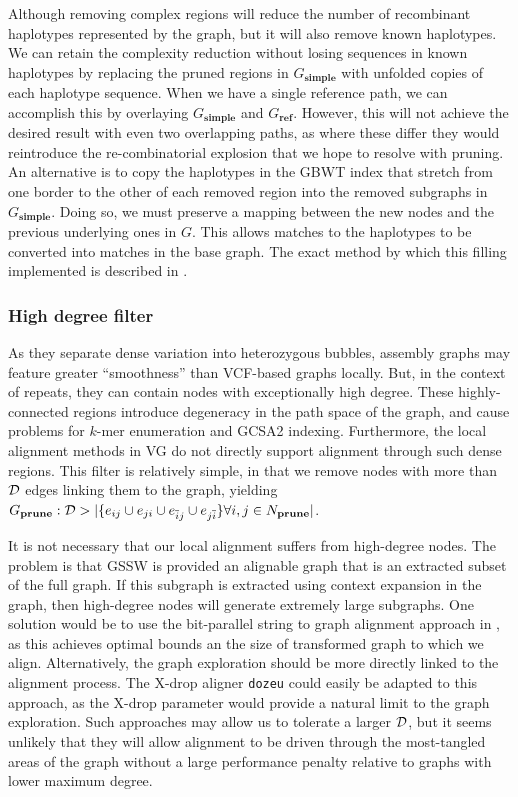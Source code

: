 Although removing complex regions will reduce the number of recombinant haplotypes represented by the graph, but it will also remove known haplotypes.
We can retain the complexity reduction without losing sequences in known haplotypes by replacing the pruned regions in $G_\textbf{simple}$ with unfolded copies of each haplotype sequence.
When we have a single reference path, we can accomplish this by overlaying $G_\textbf{simple}$ and $G_\textbf{ref}$.
However, this will not achieve the desired result with even two overlapping paths, as where these differ they would reintroduce the re-combinatorial explosion that we hope to resolve with pruning.
An alternative is to copy the haplotypes in the GBWT index that stretch from one border to the other of each removed region into the removed subgraphs in $G_\textbf{simple}$.
Doing so, we must preserve a mapping between the new nodes and the previous underlying ones in $G$.
This allows matches to the haplotypes to be converted into matches in the base graph.
The exact method by which this filling implemented is described in \cite{siren2018haplotype}.

\subsubsection{High degree filter}

As they separate dense variation into heterozygous bubbles, assembly graphs may feature greater ``smoothness'' than VCF-based graphs locally.
But, in the context of repeats, they can contain nodes with exceptionally high degree.
These highly-connected regions introduce degeneracy in the path space of the graph, and cause problems for $k$-mer enumeration and GCSA2 indexing.
Furthermore, the local alignment methods in VG do not directly support alignment through such dense regions.
This filter is relatively simple, in that we remove nodes with more than ${\cal D}$ edges linking them to the graph, yielding $G_\textbf{prune} : {\cal D} > |\{ e_{ij} \cup e_{ji} \cup e_{\overline{i}j} \cup e_{j\overline{i}} \} \forall i,j \in N_\textbf{prune}|$.

It is not necessary that our local alignment suffers from high-degree nodes.
The problem is that GSSW is provided an alignable graph that is an extracted subset of the full graph.
If this subgraph is extracted using context expansion in the graph, then high-degree nodes will generate extremely large subgraphs.
One solution would be to use the bit-parallel string to graph alignment approach in \cite{rautiainen2018bit}, as this achieves optimal bounds an the size of transformed graph to which we align.
Alternatively, the graph exploration should be more directly linked to the alignment process.
The X-drop aligner {\tt dozeu} could easily be adapted to this approach, as the X-drop parameter would provide a natural limit to the graph exploration.
Such approaches may allow us to tolerate a larger ${\cal D}$, but it seems unlikely that they will allow alignment to be driven through the most-tangled areas of the graph without a large performance penalty relative to graphs with lower maximum degree.

